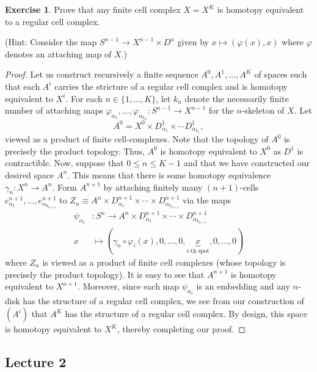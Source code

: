 \documentclass[10pt,letterpaper,cm]{nupset}
\theoremstyle{definition}
\theoremstyle{theorem}
\newtheorem{exercise}[defn]{Exercise}
\theoremstyle{remark}
\newcommand{\1}{\mathbb{1}}
\newcommand{\0}{\vec 0}
\begin{document}
\begin{exercise}\label{reg}
Prove that any finite cell complex $X= X^K$ is homotopy equivalent to a regular cell complex.

\smallskip

(Hint: Consider the map $S^{n-1} \to X^{n-1} \times D^n$ given by $x \mapsto \left(\varphi(x), x\right)$ where $\varphi$ denotes an attaching map of $X$.)
\end{exercise}
\begin{proof}
Let us construct recursively a finite sequence $A^0, A^1, \ldots, A^K$ of spaces such that each $A^i$ carries the stricture of a regular cell complex and is homotopy equivalent to $X^i$. For each $n \in \{1, \ldots, K\}$, let $k_n$ denote the necessarily finite number of attaching maps $\varphi_{\alpha_1}, \ldots, \varphi_{\alpha_{k_n}}: S^{n-1} \to X^{n-1}$ for the $n$-skeleton of $X$. Let $$A^0 = X^0 \times D^1_{\alpha_1} \times \cdots D^1_{\alpha_{k_1}},$$ viewed as a product of finite cell-complexes. Note that the topology of $A^0$ is precisely the product topology. Thus, $A^0$ is homotopy equivalent to $X^0$ as $D^1$ is contractible.  Now, suppose that $0 \leq n \leq K-1$ and that we have constructed our desired space $A^n$. This means that there is some homotopy equivalence $\gamma_n : X^n \to A^n$. Form $A^{n+1}$ by attaching finitely many $\left(n+1\right)$-cells $e^{n+1}_{\alpha_1}, \ldots, e^{n+1}_{\alpha_{k_{n+1}}}$ to $Z_n \equiv A^n \times D^{n+1}_{\alpha_1} \times \cdots \times D^{n+1}_{\alpha_{k_{n+1}}}$ via the maps 
\begin{align*}
\psi_{\alpha_i} & : S^{n} \to A^n \times D^{n+1}_{\alpha_1} \times \cdots \times D^{n+1}_{\alpha_{k_{n+1}}}
\\  x & \mapsto   \left(\gamma_n \circ \varphi_i(x), 0, \ldots, 0, \underbrace{x}_{i\text{-th spot}}, 0, \ldots, 0\right)
\end{align*} 
where $Z_n$ is viewed as a product of finite cell complexes (whose topology is precisely the product topology).
It is easy to see that $A^{n+1}$ is homotopy equivalent to $X^{n+1}$. Moreover, since each map $\psi_{\alpha_i}$ is an embedding and any $n$-disk has the structure of a regular cell complex,  we see from our construction of $\left(A^i\right)$ that $A^K$ has the structure of a regular cell complex. By design, this space is homotopy equivalent to $X^K$, thereby completing our proof. 
\end{proof}

\subsection{Lecture 2}
\end{document}
